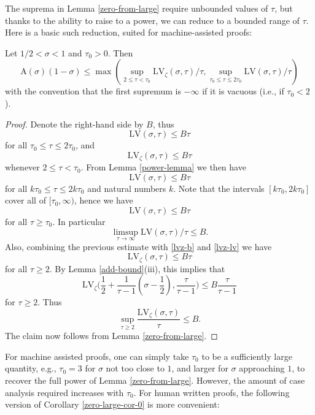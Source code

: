 \documentclass[a4paper, 10pt]{amsart}
\newcommand{\LV}{\mathrm{LV}}
\newcommand{\A}{\mathrm{A}}
\begin{document}
The suprema in Lemma \ref{zero-from-large} require unbounded values of $\tau$, but thanks to the ability to raise to a power, we can reduce to a bounded range of $\tau$.  Here is a basic such reduction, suited for machine-assisted proofs:

\begin{corollary}\label{zero-large-cor-0} Let $1/2 < \sigma < 1$ and $\tau_0 > 0$.  Then
    $$ \A(\sigma)(1-\sigma) \leq \max \left(\sup_{2 \leq \tau < \tau_0} \LV_\zeta(\sigma,\tau)/\tau, \sup_{\tau_0 \leq \tau \leq 2\tau_0} \LV(\sigma,\tau)/\tau\right)$$
    with the convention that the first supremum is $-\infty$ if it is vacuous (i.e., if $\tau_0 < 2$).
\end{corollary}

\begin{proof}
Denote the right-hand side by $B$, thus
    $$ \LV(\sigma,\tau) \leq B\tau$$
    for all $\tau_0 \leq \tau \leq 2\tau_0$, and
    \begin{equation}\label{lvz-b}
         \LV_\zeta(\sigma,\tau) \leq B\tau
    \end{equation}
    whenever $2 \leq \tau < \tau_0$.  From Lemma \ref{power-lemma} we then have
    $$ \LV(\sigma,\tau) \leq B\tau$$
    for all $k\tau_0 \leq \tau \leq 2k\tau_0$ and natural numbers $k$. Note that the intervals $[k\tau_0, 2k\tau_0]$ cover all of $[\tau_0,\infty)$, hence we have
    $$ \LV(\sigma,\tau) \leq B\tau$$
    for all $\tau \geq \tau_0$. In particular
    $$ \limsup_{\tau \to \infty} \LV(\sigma,\tau)/\tau  \leq B.$$
    Also, combining the previous estimate with \eqref{lvz-b} and \eqref{lvz-lv} we have
    \begin{equation*}\label{lvzo}
     \LV_\zeta(\sigma,\tau) \leq B\tau
    \end{equation*}
    for all $\tau \geq 2$.  By Lemma \ref{add-bound}(iii), this implies that
    $$ \LV_\zeta\bigg(\frac{1}{2} + \frac{1}{\tau-1} \left(\sigma-\frac{1}{2}\right), \frac{\tau}{\tau-1} \bigg) \leq B \frac{\tau}{\tau-1}$$
    for $\tau \geq 2$.  Thus
    $$ \sup_{\tau \geq 2} \frac{\LV_\zeta(\sigma,\tau)}{\tau} \leq B.$$
    The claim now follows from Lemma \ref{zero-from-large}.
\end{proof}

For machine assisted proofs, one can simply take $\tau_0$ to be a sufficiently large quantity, e.g., $\tau_0=3$ for $\sigma$ not too close to $1$, and larger for $\sigma$ approaching $1$, to recover the full power of Lemma \ref{zero-from-large}.  However, the amount of case analysis required increases with $\tau_0$.  For human written proofs, the following version of Corollary \ref{zero-large-cor-0} is more convenient:
\end{document}
